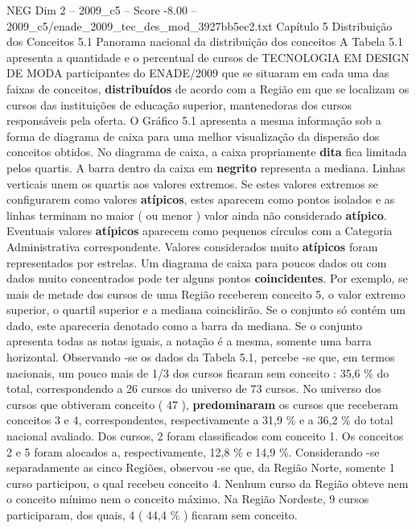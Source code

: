 \begin{textsample}{NEG Dim 2 – 2009\_c5 – Score -8.00 – 2009\_c5/enade\_2009\_tec\_des\_mod\_3927bb5ec2.txt}  \label{ex:f2_neg_016}
Capítulo 5 Distribuição dos Conceitos 5.1 Panorama nacional da distribuição dos conceitos A Tabela 5.1 apresenta a quantidade e o percentual de cursos de TECNOLOGIA EM DESIGN DE MODA participantes do ENADE/2009 que se situaram em cada uma das faixas de conceitos, \textbf{distribuídos} de acordo com a Região em que se localizam os cursos das instituições de educação superior, mantenedoras dos cursos responsáveis pela oferta.
O Gráfico 5.1 apresenta a mesma informação sob a forma de diagrama de caixa para uma melhor visualização da dispersão dos conceitos obtidos.
No diagrama de caixa, a caixa propriamente \textbf{dita} fica limitada pelos quartis.
A barra dentro da caixa em \textbf{negrito} representa a mediana.
Linhas verticais unem os quartis aos valores extremos.
Se estes valores extremos se configurarem como valores \textbf{atípicos}, estes aparecem como pontos isolados e as linhas terminam no maior ( ou menor ) valor ainda não considerado \textbf{atípico}.
Eventuais valores \textbf{atípicos} aparecem como pequenos círculos com a Categoria Administrativa correspondente.
Valores considerados muito \textbf{atípicos} foram representados por estrelas.
Um diagrama de caixa para poucos dados ou com dados muito concentrados pode ter alguns pontos \textbf{coincidentes}.
Por exemplo, se mais de metade dos cursos de uma Região receberem conceito 5, o valor extremo superior, o quartil superior e a mediana coincidirão.
Se o conjunto só contém um dado, este apareceria denotado como a barra da mediana.
Se o conjunto apresenta todas as notas iguais, a notação é a mesma, somente uma barra horizontal.
Observando -se os dados da Tabela 5.1, percebe -se que, em termos nacionais, um pouco mais de 1/3 dos cursos ficaram sem conceito : 35,6 \% do total, correspondendo a 26 cursos do universo de 73 cursos.
No universo dos cursos que obtiveram conceito ( 47 ), \textbf{predominaram} os cursos que receberam conceitos 3 e 4, correspondentes, respectivamente a 31,9 \% e a 36,2 \% do total nacional avaliado.
Dos cursos, 2 foram classificados com conceito 1.
Os conceitos 2 e 5 foram alocados a, respectivamente, 12,8 \% e 14,9 \%.
Considerando -se separadamente as cinco Regiões, observou -se que, da Região Norte, somente 1 curso participou, o qual recebeu conceito 4.
Nenhum curso da Região obteve nem o conceito mínimo nem o conceito máximo.
Na Região Nordeste, 9 cursos participaram, dos quais, 4 ( 44,4 \% ) ficaram sem conceito.

\end{textsample}
